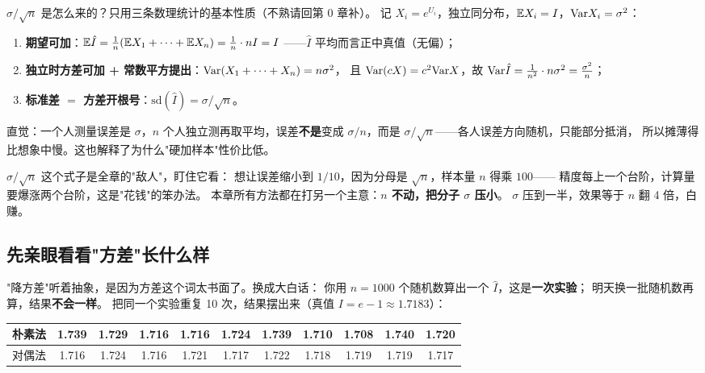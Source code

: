 \begin{pbox}
$\sigma/\sqrt n$ 是怎么来的？只用三条数理统计的基本性质（不熟请回第 0 章补）。
记 $X_i=e^{U_i}$，独立同分布，$\mathbb{E} X_i=I$，$\mathrm{Var} X_i=\sigma^2$：
\begin{enumerate}[leftmargin=2em]
  \item \textbf{期望可加}：$\mathbb{E}\hat I=\frac1n(\mathbb{E} X_1+\cdots+\mathbb{E} X_n)=\frac1n\cdot nI=I$
  ——$\hat I$ 平均而言正中真值（无偏）；
  \item \textbf{独立时方差可加 + 常数平方提出}：$\mathrm{Var}(X_1+\cdots+X_n)=n\sigma^2$，
  且 $\mathrm{Var}(cX)=c^2\mathrm{Var} X$，故
  $\mathrm{Var}\hat I=\frac1{n^2}\cdot n\sigma^2=\frac{\sigma^2}{n}$；
  \item \textbf{标准差 $=$ 方差开根号}：$\mathrm{sd}(\hat I)=\sigma/\sqrt n$。
\end{enumerate}
直觉：一个人测量误差是 $\sigma$，$n$ 个人独立测再取平均，误差\textbf{不是}变成
$\sigma/n$，而是 $\sigma/\sqrt n$——各人误差方向随机，只能部分抵消，
所以摊薄得比想象中慢。这也解释了为什么"硬加样本"性价比低。
\end{pbox}

\begin{pbox}
$\sigma/\sqrt n$ 这个式子是全章的"敌人"，盯住它看：
想让误差缩小到 $1/10$，因为分母是 $\sqrt n$，样本量 $n$ 得乘 $100$——
精度每上一个台阶，计算量要爆涨两个台阶，这是"花钱"的笨办法。
本章所有方法都在打另一个主意：\textbf{$n$ 不动，把分子 $\sigma$ 压小}。
$\sigma$ 压到一半，效果等于 $n$ 翻 4 倍，白赚。
\end{pbox}

\subsection{先亲眼看看"方差"长什么样}

"降方差"听着抽象，是因为方差这个词太书面了。换成大白话：
你用 $n=1000$ 个随机数算出一个 $\hat I$，这是\textbf{一次实验}；
明天换一批随机数再算，结果\textbf{不会一样}。
把同一个实验重复 10 次，结果摆出来（真值 $I=e-1\approx1.7183$）：

\begin{center}
\renewcommand{\arraystretch}{1.4}
\small
\begin{tabular}{|l|cccccccccc|}
\hline
朴素法 & 1.739 & 1.729 & 1.716 & 1.716 & 1.724 & 1.739 & 1.710 & 1.708 & 1.740 & 1.720\\\hline
对偶法 & 1.716 & 1.724 & 1.716 & 1.721 & 1.717 & 1.722 & 1.718 & 1.719 & 1.719 & 1.717\\\hline
\end{tabular}
\end{center}

